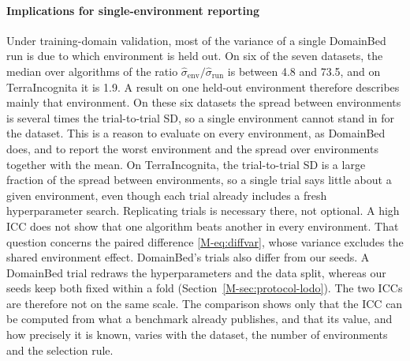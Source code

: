 \paragraph{Implications for single-environment reporting} Under
training-domain validation, most of the variance of a single DomainBed run is
due to which environment is held out. On six of the seven datasets, the median over
algorithms of the ratio $\hat\sigma_{\text{env}}/\hat\sigma_{\text{run}}$
is between 4.8 and 73.5, and on TerraIncognita it is 1.9. A result on one held-out
environment therefore describes mainly that environment. On these six
datasets the spread between environments is several times the trial-to-trial
SD, so a single environment cannot stand in for the dataset. This is a reason to evaluate on
every environment, as DomainBed does, and to report the worst environment and
the spread over environments together with the mean. On TerraIncognita, the
trial-to-trial SD is a large fraction of the spread between environments, so a
single trial says little about a given environment, even though each trial
already includes a fresh hyperparameter search. Replicating trials is
necessary there, not optional. A high ICC does not show that one algorithm
beats another in every environment. That question concerns the paired
difference \eqref{M-eq:diffvar}, whose variance excludes the shared environment
effect. DomainBed's trials also differ from our seeds. A DomainBed trial
redraws the hyperparameters and the data split, whereas our seeds keep both
fixed within a fold (Section~\ref{M-sec:protocol-lodo}). The two ICCs are
therefore not on the same scale. The comparison shows only that the ICC can be
computed from what a benchmark already publishes, and that its value, and how
precisely it is known, varies with the dataset, the number of environments and
the selection rule.
